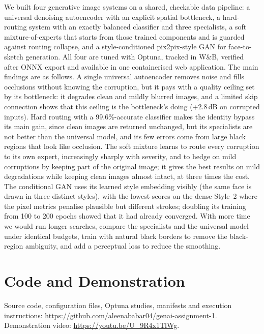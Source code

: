 \documentclass[conference]{IEEEtran}
\begin{document}
We built four generative image systems on a shared, checkable data
pipeline: a universal denoising autoencoder with an explicit spatial
bottleneck, a hard-routing system with an exactly balanced classifier and
three specialists, a soft mixture-of-experts that starts from those trained
components and is guarded against routing collapse, and a style-conditioned
pix2pix-style GAN for face-to-sketch generation. All four are tuned with
Optuna, tracked in W\&B, verified after ONNX export and available in one
containerised web application.
The main findings are as follows. A single universal autoencoder removes
noise and fills occlusions without knowing the corruption, but it pays with
a quality ceiling set by its bottleneck: it degrades clean and mildly
blurred images, and a limited skip connection shows that this ceiling is the
bottleneck's doing (+2.8\,dB on corrupted inputs). Hard routing with a
99.6\%-accurate classifier makes the identity bypass its main gain, since
clean images are returned unchanged, but its specialists are not better than
the universal model, and its few errors come from large black regions that
look like occlusion. The soft mixture learns to route every corruption to
its own expert, increasingly sharply with severity, and to hedge on mild
corruptions by keeping part of the original image; it gives the best results
on mild degradations while keeping clean images almost intact, at three times
the cost. The conditional GAN uses its learned style embedding visibly (the
same face is drawn in three distinct styles), with the lowest scores on the
dense Style~2 where the pixel metrics penalise plausible but different
strokes; doubling its training from 100 to 200 epochs showed that it had
already converged. With more time we would run longer searches, compare the
specialists and the universal model under identical
budgets, train with natural black borders to remove the black-region
ambiguity, and add a perceptual loss to reduce the smoothing.

\section*{Code and Demonstration}
Source code, configuration files, Optuna studies, manifests and execution
instructions:
\url{https://github.com/aleenababar04/genai-assignment-1}.\\
Demonstration video:
\url{https://youtu.be/U_9R4x1TlWg}.



\end{document}

